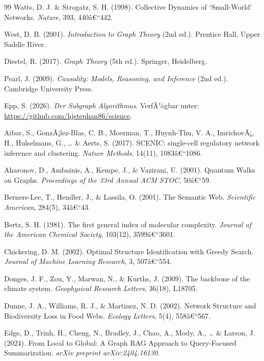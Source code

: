 ﻿\documentclass[12pt,a4paper,twoside]{article}
\theoremstyle{definition}
\theoremstyle{plain}
\theoremstyle{remark}
\begin{document}
\begin{thebibliography}{99}
  Watts, D. J. \& Strogatz, S. H. (1998).
  Collective Dynamics of `Small-World' Networks.
  \textit{Nature}, 393, 440â€“442.

  West, D. B. (2001).
  \textit{Introduction to Graph Theory} (2nd ed.).
  Prentice Hall, Upper Saddle River.

  Diestel, R. (2017).
  \textit{Graph Theory} (5th ed.).
  Springer, Heidelberg.

  Pearl, J. (2009).
  \textit{Causality: Models, Reasoning, and Inference} (2nd ed.).
  Cambridge University Press.


  Epp, S. (2026).
  \textit{Der Subgraph Algorithmus}.
  VerfÃ¼gbar unter: \url{https://github.com/hjstephan86/science}.

  Aibar, S., GonzÃ¡lez-Blas, C. B., Moerman, T., Huynh-Thu, V. A.,
  ImrichovÃ¡, H., Hulselmans, G., \ldots{} \& Aerts, S. (2017).
  SCENIC: single-cell regulatory network inference and clustering.
  \textit{Nature Methods}, 14(11), 1083â€“1086.

  Aharonov, D., Ambainis, A., Kempe, J., \& Vazirani, U. (2001).
  Quantum Walks on Graphs.
  \textit{Proceedings of the 33rd Annual ACM STOC}, 50â€“59.

  Berners-Lee, T., Hendler, J., \& Lassila, O. (2001).
  The Semantic Web.
  \textit{Scientific American}, 284(5), 34â€“43.

  Bertz, S. H. (1981).
  The first general index of molecular complexity.
  \textit{Journal of the American Chemical Society}, 103(12), 3599â€“3601.

  Chickering, D. M. (2002).
  Optimal Structure Identification with Greedy Search.
  \textit{Journal of Machine Learning Research}, 3, 507â€“554.

  Donges, J. F., Zou, Y., Marwan, N., \& Kurths, J. (2009).
  The backbone of the climate system.
  \textit{Geophysical Research Letters}, 36(18), L18705.

  Dunne, J. A., Williams, R. J., \& Martinez, N. D. (2002).
  Network Structure and Biodiversity Loss in Food Webs.
  \textit{Ecology Letters}, 5(4), 558â€“567.

  Edge, D., Trinh, H., Cheng, N., Bradley, J., Chao, A.,
  Mody, A., \ldots{} \& Larson, J. (2024).
  From Local to Global: A Graph RAG Approach to
  Query-Focused Summarization.
  \textit{arXiv preprint arXiv:2404.16130}.


\end{thebibliography}
\end{document}
